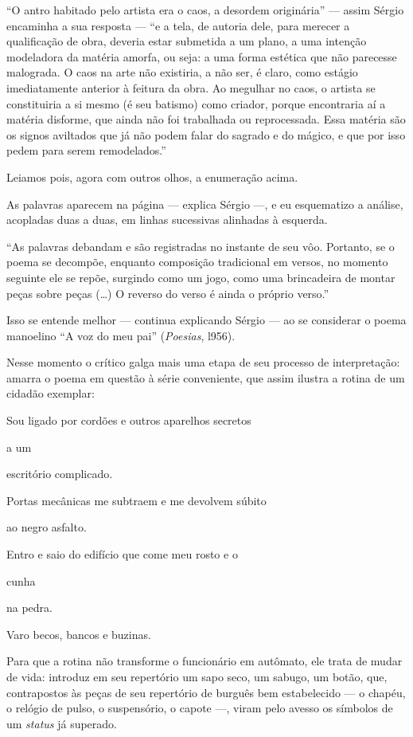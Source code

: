 ``O antro habitado pelo artista era o caos, a desordem originária'' ---
assim Sérgio encaminha a sua resposta --- ``e a tela, de autoria dele,
para merecer a qualificação de obra, deveria estar submetida a um plano,
a uma intenção modeladora da matéria amorfa, ou seja: a uma forma
estética que não parecesse malograda. O caos na arte não existiria, a
não ser, é claro, como estágio imediatamente anterior à feitura da obra.
Ao megulhar no caos, o artista se constituiria a si mesmo (é seu
batismo) como criador, porque encontraria aí a matéria disforme, que
ainda não foi trabalhada ou reprocessada. Essa matéria são os signos
aviltados que já não podem falar do sagrado e do mágico, e que por isso
pedem para serem remodelados.''

Leiamos pois, agora com outros olhos, a enumeração acima.

As palavras aparecem na página --- explica Sérgio ---, e eu esquematizo a
análise, acopladas duas a duas, em linhas sucessivas alinhadas à
esquerda.

``As palavras debandam e são registradas no instante de seu vôo.
Portanto, se o poema se decompõe, enquanto composição tradicional em
versos, no momento seguinte ele se repõe, surgindo como um jogo, como
uma brincadeira de montar peças sobre peças (\ldots{}) O reverso do verso é
ainda o próprio verso.''

Isso se entende melhor --- continua explicando Sérgio --- ao se considerar
o poema manoelino ``A voz do meu pai'' (\emph{Poesias}, l956).

Nesse momento o crítico galga mais uma etapa de seu processo de
interpretação: amarra o poema em questão à série conveniente, que assim
ilustra a rotina de um cidadão exemplar:

Sou ligado por cordões e outros aparelhos secretos

a um

escritório complicado.

Portas mecânicas me subtraem e me devolvem súbito

ao negro asfalto.

Entro e saio do edifício que come meu rosto e o

cunha

na pedra.

Varo becos, bancos e buzinas.

Para que a rotina não transforme o funcionário em autômato, ele trata de
mudar de vida: introduz em seu repertório um sapo seco, um sabugo, um
botão, que, contrapostos às peças de seu repertório de burguês bem
estabelecido --- o chapéu, o relógio de pulso, o suspensório, o capote
---, viram pelo avesso os símbolos de um \emph{status} já superado.

